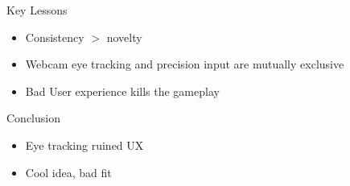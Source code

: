 \documentclass{beamer}
\begin{document}
\begin{frame}{Key Lessons}
\begin{itemize}
    \item Consistency $>$ novelty
    \item Webcam eye tracking and precision input are mutually exclusive
    \item Bad User experience kills the gameplay
\end{itemize}
\end{frame}

\begin{frame}{Conclusion}
\begin{itemize}
    \item Eye tracking ruined UX
    \item Cool idea, bad fit
\end{itemize}
\end{frame}
\end{document}
